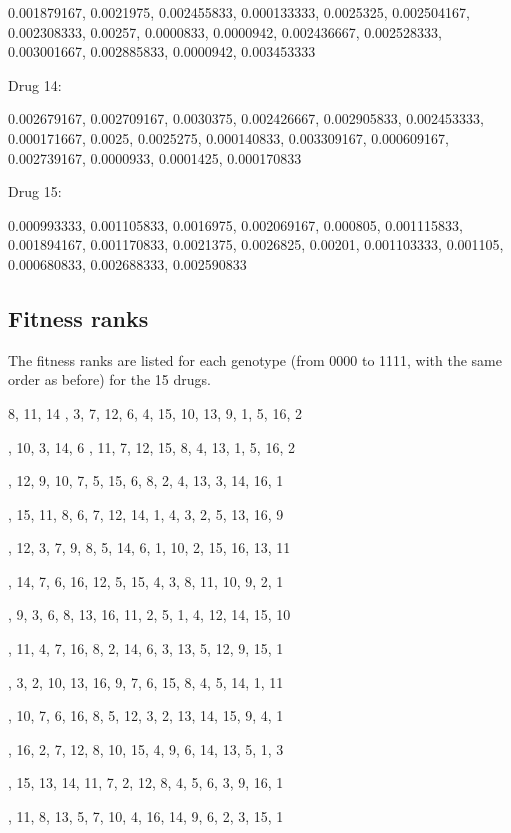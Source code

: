 \documentclass[12pt]{amsart}
\theoremstyle{plain}
\theoremstyle{definition}
\begin{document}
{0.001879167, 0.0021975, 0.002455833, 0.000133333, 0.0025325, 0.002504167, 0.002308333, 0.00257, 0.0000833, 0.0000942, 0.002436667,  0.002528333, 0.003001667, 0.002885833, 0.0000942, 0.003453333


\bigskip
Drug 14:

0.002679167, 0.002709167, 0.0030375, 0.002426667, 0.002905833, 0.002453333, 0.000171667, 0.0025, 0.0025275, 0.000140833, 0.003309167, 0.000609167, 0.002739167, 0.0000933, 0.0001425, 0.000170833

\bigskip
Drug 15:

0.000993333, 0.001105833, 0.0016975, 0.002069167, 0.000805, 0.001115833, 0.001894167, 0.001170833, 0.0021375, 0.0026825, 0.00201, 0.001103333, 0.001105, 0.000680833, 0.002688333, 0.002590833
 


\newpage
\subsection{Fitness ranks}
The fitness ranks are listed for each genotype (from 0000 to 1111, with the same order as before)
for the 15 drugs. 



8, 11,   14 , 3, 7, 12, 6, 4, 15, 10, 13, 9, 1, 5, 16, 2 

, 10, 3, 14, 6 , 11, 7, 12, 15, 8, 4, 13, 1, 5, 16, 2

, 12, 9, 10, 7, 5, 15, 6, 8, 2, 4, 13, 3, 14, 16, 1



, 15, 11, 8, 6, 7, 12, 14, 1, 4, 3, 2, 5, 13, 16, 9



, 12, 3, 7, 9, 8, 5, 14, 6, 1, 10, 2, 15, 16, 13, 11

, 14, 7, 6, 16, 12, 5, 15, 4, 3, 8, 11, 10, 9, 2, 1


, 9, 3, 6, 8, 13, 16, 11, 2, 5, 1, 4, 12, 14, 15, 10


, 11, 4, 7, 16, 8, 2, 14, 6, 3, 13, 5, 12, 9, 15, 1


, 3, 2, 10, 13, 16, 9, 7, 6, 15, 8, 4, 5, 14, 1, 11


, 10, 7, 6, 16, 8, 5, 12, 3, 2, 13, 14, 15, 9, 4, 1

, 16, 2, 7, 12, 8, 10, 15, 4, 9, 6, 14, 13, 5, 1, 3

, 15, 13, 14, 11, 7, 2, 12, 8, 4, 5, 6, 3, 9, 16, 1

, 11, 8, 13, 5, 7, 10, 4, 16, 14, 9, 6, 2, 3, 15, 1

}
\end{document}
